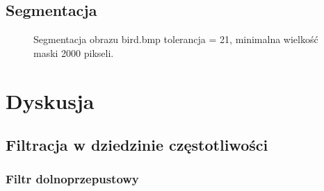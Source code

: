 \documentclass{classrep}
\begin{document}
\subsection{Segmentacja}
 \begin{figure}[H]
  \centering
  \caption{Segmentacja obrazu bird.bmp tolerancja = 21, minimalna wielkość maski 2000 pikseli.}
  \label{fig_wyniki:seg_bird}
\end{figure}





\section{Dyskusja}

\subsection{Filtracja w dziedzinie częstotliwości}

\subsubsection{Filtr dolnoprzepustowy}
\end{document}
